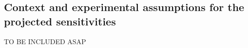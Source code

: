 \subsection{Context and experimental assumptions for the projected sensitivities}

{\color{red} TO BE INCLUDED ASAP}
